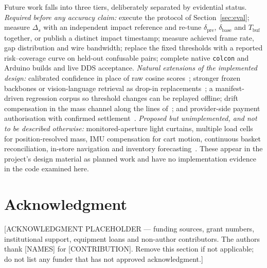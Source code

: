 \documentclass[conference]{IEEEtran}
\begin{document}
Future work falls into three tiers, deliberately separated by evidential status.
\emph{Required before any accuracy claim:} execute the protocol of Section~\ref{sec:eval}; measure
$\Delta_s$ with an independent impact reference and re-tune $\delta_{\mathrm{pre}}$,
$\delta_{\mathrm{base}}$ and $T_{\mathrm{buf}}$ together, or publish a distinct impact timestamp;
measure achieved frame rate, gap distribution and wire bandwidth; replace the fixed thresholds with a
reported risk--coverage curve on held-out confusable pairs; complete native \texttt{colcon} and
Arduino builds and live DDS acceptance. \emph{Natural extensions of the implemented design:}
calibrated confidence in place of raw cosine scores~\cite{R60,R61}; stronger frozen backbones or
vision-language retrieval as drop-in replacements~\cite{R58,R59,R62}; a manifest-driven regression
corpus so threshold changes can be replayed offline; drift compensation in the mass channel along the
lines of~\cite{R02}; and provider-side payment authorisation with confirmed settlement~\cite{R80}.
\emph{Proposed but unimplemented, and not to be described otherwise:} monitored-aperture light
curtains, multiple load cells for position-resolved mass, IMU compensation for cart motion, continuous
basket reconciliation, in-store navigation and inventory forecasting~\cite{R21}. These appear in the
project's design material as planned work and have no implementation evidence in the code examined
here.

\section*{Acknowledgment}
[ACKNOWLEDGMENT PLACEHOLDER --- funding sources, grant numbers, institutional support, equipment loans
and non-author contributors. The authors thank [NAMES] for [CONTRIBUTION]. Remove this section if not
applicable; do not list any funder that has not approved acknowledgment.]
\end{document}
